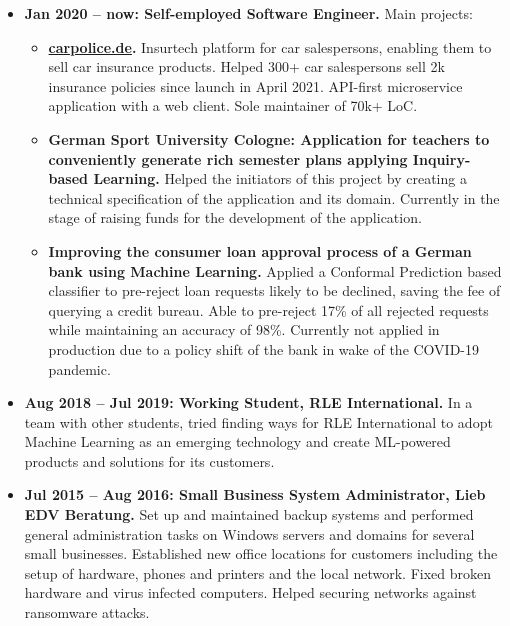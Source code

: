 \documentclass[10pt]{article}
\begin{document}
\begin{itemize}[label={}, leftmargin=*]

\item \textbf{Jan 2020 -- now: Self-employed Software Engineer.} Main
  projects:

  \begin{itemize}[label={}, leftmargin=*]
    \item \textbf{\href{https://carpolice.de}{carpolice.de}.}
      Insurtech platform for car salespersons, enabling them to sell
      car insurance products.
      Helped 300+ car salespersons sell 2k insurance policies since
      launch in April 2021.
      API-first microservice application with a web client.
      Sole maintainer of 70k+ LoC.

    \item \textbf{German Sport University Cologne: Application for
      teachers to conveniently generate rich semester plans applying
      Inquiry-based Learning.}
      Helped the initiators of this project by creating a technical
      specification of the application and its domain.
      Currently in the stage of raising funds for the development of
      the application.

    \item \textbf{Improving the consumer loan approval process of a
      German bank using Machine Learning.}
      Applied a Conformal Prediction based classifier to pre-reject
      loan requests likely to be declined, saving the fee of querying
      a credit bureau.
      Able to pre-reject 17\% of all rejected requests while
      maintaining an accuracy of 98\%.
      Currently not applied in production due to a policy shift of the
      bank in wake of the COVID-19 pandemic.
  \end{itemize}

\item \textbf{Aug 2018 -- Jul 2019: Working Student, RLE International.}
In a team with other students, tried finding ways for RLE
International to adopt Machine Learning as an emerging technology and
create ML-powered products and solutions for its customers.

\item \textbf{Jul 2015 -- Aug 2016: Small Business System Administrator,
Lieb EDV Beratung.}
Set up and maintained backup systems and performed general
administration tasks on Windows servers and domains for several small
businesses.
Established new office locations for customers including the setup of
hardware, phones and printers and the local network.
Fixed broken hardware and virus infected computers.
Helped securing networks against ransomware attacks.

\end{itemize}
\end{document}
